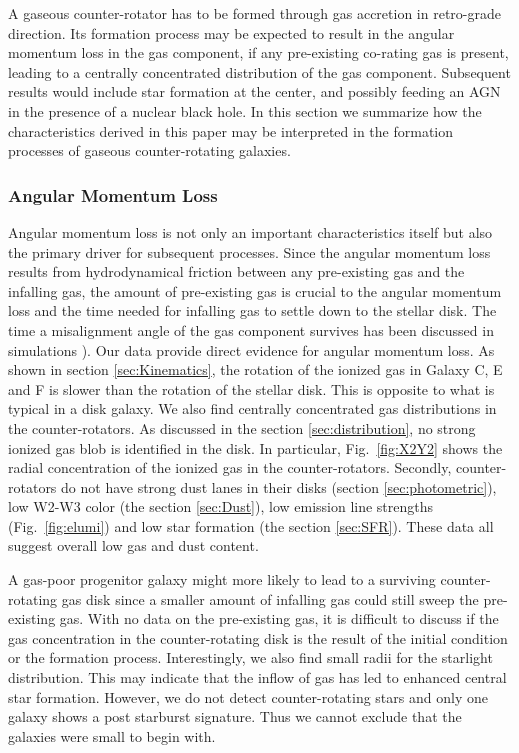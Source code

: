 \documentclass[fleqn,usenatbib]{mnras}
\begin{document}
A gaseous counter-rotator has to be formed through gas accretion 
in retro-grade direction. 
Its formation process may be expected to result in the angular momentum loss in the gas component, if any pre-existing co-rating gas is present, leading 
to a centrally concentrated distribution of the gas component.
Subsequent results would include
star formation at the center, and possibly feeding an AGN in the presence of a nuclear black hole.
In this section we summarize how the characteristics derived in this paper
may be interpreted in the formation processes 
of gaseous counter-rotating galaxies.

\subsubsection{Angular Momentum Loss} \label{sec:discussion_AM}

Angular momentum loss is not only an important characteristics itself
but also the primary driver for subsequent processes.
Since the angular momentum loss results from hydrodynamical friction between any pre-existing gas and the infalling gas,
the amount of pre-existing gas is crucial to 
the angular momentum loss and the time needed for infalling gas to settle down 
to the stellar disk.
The time a misalignment angle 
of the gas component survives has been discussed in simulations \citep{vandeVoort2015,Khim2021}). Our data provide direct evidence for angular momentum loss. As shown in section \ref{sec:Kinematics},
the rotation of the ionized gas in Galaxy C, E and F 
is slower than the rotation of the stellar disk. 
This is opposite to what is typical in a disk galaxy. 
We also find centrally concentrated gas distributions in the counter-rotators.
As discussed in the section \ref{sec:distribution}, 
no strong ionized gas blob is identified in the disk. 
In particular, Fig.~\ref{fig:X2Y2} shows 
the radial concentration of the ionized gas in the counter-rotators.
Secondly, counter-rotators do not have strong dust lanes in their disks (section \ref{sec:photometric}), 
low W2-W3 color (the section \ref{sec:Dust}), 
low emission line strengths (Fig.~\ref{fig:elumi})
and low star formation (the section \ref{sec:SFR}). These data all suggest overall low gas and dust content.

A gas-poor progenitor galaxy might more likely to lead to
a surviving counter-rotating gas disk
since a smaller amount of infalling gas could still sweep the pre-existing gas.
With no data on the pre-existing gas, it is difficult to discuss if the gas concentration in the counter-rotating disk 
is the result of the initial condition or the formation process. 
Interestingly, we also find small radii for the starlight distribution. This may indicate that the inflow of gas has led to enhanced central star formation. However, we do not detect counter-rotating stars and only one galaxy shows a post starburst signature. Thus we cannot exclude that the galaxies were small to begin with.
\end{document}
